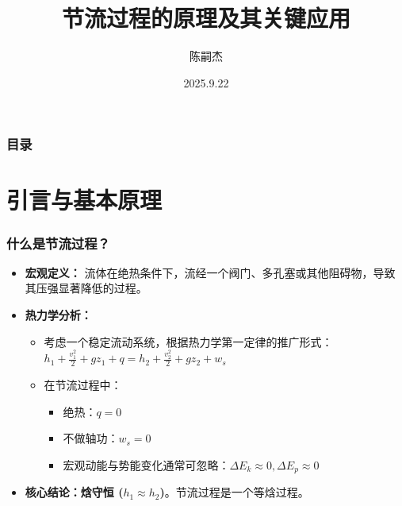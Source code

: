 \documentclass{beamer}
\title{节流过程的原理及其关键应用}
\author{陈嗣杰}
\institute{课程：热力学与统计物理}
\date{2025.9.22}
\begin{document}
\begin{frame}
  \titlepage
\end{frame}

\begin{frame}
  \frametitle{目录}
  \tableofcontents
\end{frame}


\section{引言与基本原理}

\begin{frame}
  \frametitle{什么是节流过程？}
  \begin{itemize}
    \item<1-> \textbf{宏观定义：} 流体在\alert{绝热}条件下，流经一个阀门、多孔塞或其他阻碍物，导致其\alert{压强显著降低}的过程。
    \item<2-> \textbf{热力学分析：}
    \begin{itemize}
      \item 考虑一个稳定流动系统，根据热力学第一定律的推广形式：
      $h_1 + \frac{v_1^2}{2} + gz_1 + q = h_2 + \frac{v_2^2}{2} + gz_2 + w_s$
      \item 在节流过程中：
      \begin{itemize}
          \item 绝热：$q=0$
          \item 不做轴功：$w_s=0$
          \item 宏观动能与势能变化通常可忽略：$\Delta E_k \approx 0, \Delta E_p \approx 0$
      \end{itemize}
    \end{itemize}
    \item<3-> \textbf{核心结论：\alert{焓守恒 ($h_1 \approx h_2$)}}。节流过程是一个\alert{等焓}过程。
    
  \end{itemize}
\end{frame}
\end{document}
